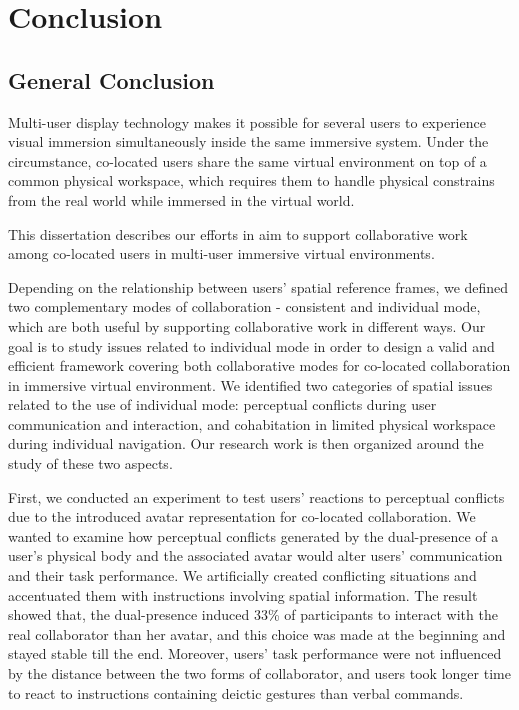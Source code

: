 \chapter*{Conclusion}

\mtcaddchapter[Conclusion]

\section*{General Conclusion}

Multi-user display technology makes it possible for several users to experience visual immersion simultaneously inside the same immersive system. Under the circumstance, co-located users share the same virtual environment on top of a common physical workspace, which requires them to handle physical constrains from the real world while immersed in the virtual world.

This dissertation describes our efforts in aim to support collaborative work among co-located users in multi-user immersive virtual environments.

Depending on the relationship between users' spatial reference frames, we defined two complementary modes of collaboration - consistent and individual mode, which are both useful by supporting collaborative work in different ways. Our goal is to study issues related to individual mode in order to design a valid and efficient framework covering both collaborative modes for co-located collaboration in immersive virtual environment. We identified two categories of spatial issues related to the use of individual mode: perceptual conflicts during user communication and interaction, and cohabitation in limited physical workspace during individual navigation. Our research work is then organized around the study of these two aspects.

First, we conducted an experiment to test users' reactions to perceptual conflicts due to the introduced avatar representation for co-located collaboration. We wanted to examine how perceptual conflicts generated by the dual-presence of a user's physical body and the associated avatar would alter users' communication and their task performance. We artificially created conflicting situations and accentuated them with instructions involving spatial information. The result showed that, the dual-presence induced 33\% of participants to interact with the real collaborator than her avatar, and this choice was made at the beginning and stayed stable till the end. Moreover, users' task performance were not influenced by the distance between the two forms of collaborator, and users took longer time to react to instructions containing deictic gestures than verbal commands.

